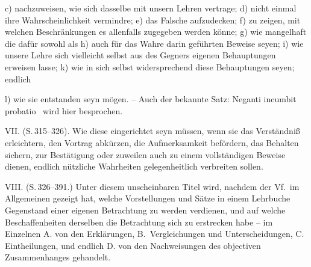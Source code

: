 c) nachzuweisen, wie sich dasselbe mit unsern Lehren vertrage; d) nicht einmal ihre Wahrscheinlichkeit vermindre; e) das Falsche aufzudecken; f) zu zeigen, mit welchen Beschränkungen es allenfalls zugegeben werden könne; g) wie mangelhaft die dafür sowohl als h) auch für das Wahre darin geführten Beweise seyen; i) wie unsere Lehre sich vielleicht selbst aus des Gegners eigenen Behauptungen erweisen lasse; k) wie in sich selbst widersprechend diese Behauptungen seyen; endlich \par 
l) wie sie entstanden seyn mögen. -- Auch der bekannte Satz: Neganti incumbit probatio \umA\  wird hier besprochen. \par 
VII.  (S.\,315--326). Wie diese eingerichtet seyn müssen, wenn sie das Verständniß erleichtern, den Vortrag abkürzen, die Aufmerksamkeit befördern, das Behalten sichern, zur Bestätigung oder zuweilen auch zu einem vollständigen Beweise dienen, endlich nützliche Wahrheiten gelegenheitlich verbreiten sollen. \par 
VIII.  (S.\,326--391.) Unter diesem unscheinbaren Titel wird, nachdem der Vf.\ im Allgemeinen gezeigt hat, welche Vorstellungen und Sätze in einem Lehrbuche Gegenstand einer eigenen Betrachtung zu werden verdienen, und auf welche Beschaffenheiten derselben die Betrachtung sich zu erstrecken habe -- im Einzelnen A. von den Erklärungen, B.\ Vergleichungen und Unterscheidungen, C. Eintheilungen, und endlich D. von den Nachweisungen des objectiven Zusammenhanges gehandelt.  \par 
